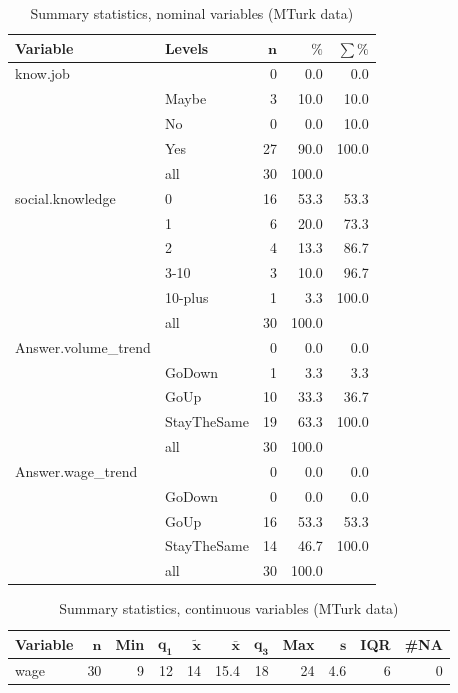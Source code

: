 \documentclass[a4paper,10pt]{article}\usepackage[]{graphicx}\usepackage[]{color}
\begin{document}
\begin{table}[ht]
\centering
{\footnotesize
\begin{tabular}{ll|rrr}
 \textbf{Variable} & \textbf{Levels} & $\mathbf{n}$ & $\mathbf{\%}$ & $\mathbf{\sum \%}$ \\ 
  \hline
know.job &  & 0 & 0.0 & 0.0 \\ 
   & Maybe & 3 & 10.0 & 10.0 \\ 
   & No & 0 & 0.0 & 10.0 \\ 
   & Yes & 27 & 90.0 & 100.0 \\ 
   \hline
 & all & 30 & 100.0 &  \\ 
   \hline
\hline
social.knowledge & 0 & 16 & 53.3 & 53.3 \\ 
   & 1 & 6 & 20.0 & 73.3 \\ 
   & 2 & 4 & 13.3 & 86.7 \\ 
   & 3-10 & 3 & 10.0 & 96.7 \\ 
   & 10-plus & 1 & 3.3 & 100.0 \\ 
   \hline
 & all & 30 & 100.0 &  \\ 
   \hline
\hline
Answer.volume\_trend &  & 0 & 0.0 & 0.0 \\ 
   & GoDown & 1 & 3.3 & 3.3 \\ 
   & GoUp & 10 & 33.3 & 36.7 \\ 
   & StayTheSame & 19 & 63.3 & 100.0 \\ 
   \hline
 & all & 30 & 100.0 &  \\ 
   \hline
\hline
Answer.wage\_trend &  & 0 & 0.0 & 0.0 \\ 
   & GoDown & 0 & 0.0 & 0.0 \\ 
   & GoUp & 16 & 53.3 & 53.3 \\ 
   & StayTheSame & 14 & 46.7 & 100.0 \\ 
   \hline
 & all & 30 & 100.0 &  \\ 
   \hline
\hline
\end{tabular}
}
\caption{Summary statistics, nominal variables (MTurk data)} 
\label{tab1:49-9070}
\end{table}
\begin{table}[ht]
\centering
{\footnotesize
\begin{tabular}{lrrrrrrrrrr}
 \textbf{Variable} & $\mathbf{n}$ & \textbf{Min} & $\mathbf{q_1}$ & $\mathbf{\widetilde{x}}$ & $\mathbf{\bar{x}}$ & $\mathbf{q_3}$ & \textbf{Max} & $\mathbf{s}$ & \textbf{IQR} & \textbf{\#NA} \\ 
  \hline
wage & 30 & 9 & 12 & 14 & 15.4 & 18 & 24 & 4.6 & 6 & 0 \\ 
  \end{tabular}
}
\caption{Summary statistics, continuous variables (MTurk data)} 
\label{tab2:49-9070}
\end{table}
\end{document}
